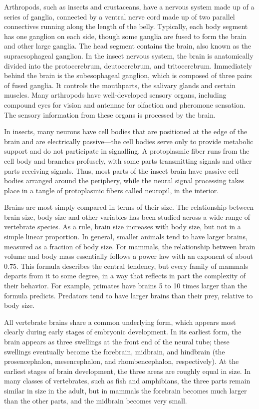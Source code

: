 Arthropods, such as insects and crustaceans, have a nervous system made up of a series of ganglia, connected by a ventral nerve cord made up of two parallel connectives running along the length of the belly. Typically, each body segment has one ganglion on each side, though some ganglia are fused to form the brain and other large ganglia. The head segment contains the brain, also known as the supraesophageal ganglion. In the insect nervous system, the brain is anatomically divided into the protocerebrum, deutocerebrum, and tritocerebrum. Immediately behind the brain is the subesophageal ganglion, which is composed of three pairs of fused ganglia. It controls the mouthparts, the salivary glands and certain muscles. Many arthropods have well-developed sensory organs, including compound eyes for vision and antennae for olfaction and pheromone sensation. The sensory information from these organs is processed by the brain.

In insects, many neurons have cell bodies that are positioned at the edge of the brain and are electrically passive---the cell bodies serve only to provide metabolic support and do not participate in signalling. A protoplasmic fiber runs from the cell body and branches profusely, with some parts transmitting signals and other parts receiving signals. Thus, most parts of the insect brain have passive cell bodies arranged around the periphery, while the neural signal processing takes place in a tangle of protoplasmic fibers called neuropil, in the interior.

Brains are most simply compared in terms of their size. The relationship between brain size, body size and other variables has been studied across a wide range of vertebrate species. As a rule, brain size increases with body size, but not in a simple linear proportion. In general, smaller animals tend to have larger brains, measured as a fraction of body size. For mammals, the relationship between brain volume and body mass essentially follows a power law with an exponent of about 0.75. This formula describes the central tendency, but every family of mammals departs from it to some degree, in a way that reflects in part the complexity of their behavior. For example, primates have brains 5 to 10 times larger than the formula predicts. Predators tend to have larger brains than their prey, relative to body size.

All vertebrate brains share a common underlying form, which appears most clearly during early stages of embryonic development. In its earliest form, the brain appears as three swellings at the front end of the neural tube; these swellings eventually become the forebrain, midbrain, and hindbrain (the prosencephalon, mesencephalon, and rhombencephalon, respectively). At the earliest stages of brain development, the three areas are roughly equal in size. In many classes of vertebrates, such as fish and amphibians, the three parts remain similar in size in the adult, but in mammals the forebrain becomes much larger than the other parts, and the midbrain becomes very small.

